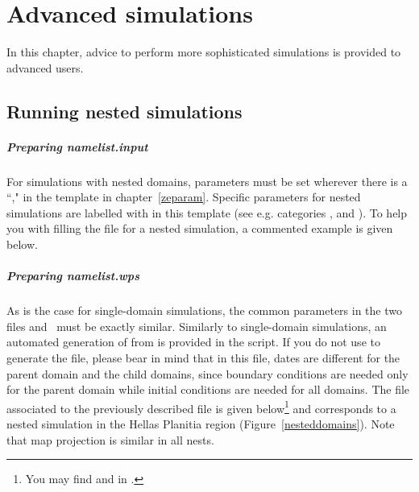 \chapter{Advanced simulations}\label{advance}

\vk
In this chapter, advice to perform more sophisticated simulations is provided to advanced users. 

\mk
\section{Running nested simulations}\label{nests}

\paragraph{Preparing namelist.input} For simulations with  nested domains,  parameters must be set wherever there is a ``," in the  template in chapter~\ref{zeparam}. Specific parameters for nested simulations are labelled with  in this  template (see e.g. categories ,  and ). To help you with filling the  file for a nested simulation, a commented example is given below. 

\vskip -0.4cm
\scriptsize
{}
\normalsize

\paragraph{Preparing namelist.wps} As is the case for single-domain simulations, the common parameters in the two files  and~ must be exactly similar. Similarly to single-domain simulations, an automated generation of  from  is provided in the  script. If you do not use  to generate the  file, please bear in mind that in this file, dates are different for the parent domain and the child domains, since boundary conditions are needed only for the parent domain while initial conditions are needed for all domains. The  file associated to the previously described  file is given below\footnote{You may find  and  in .} and corresponds to a nested simulation in the Hellas Planitia region (Figure~\ref{nesteddomains}). Note that map projection is similar in all nests.

